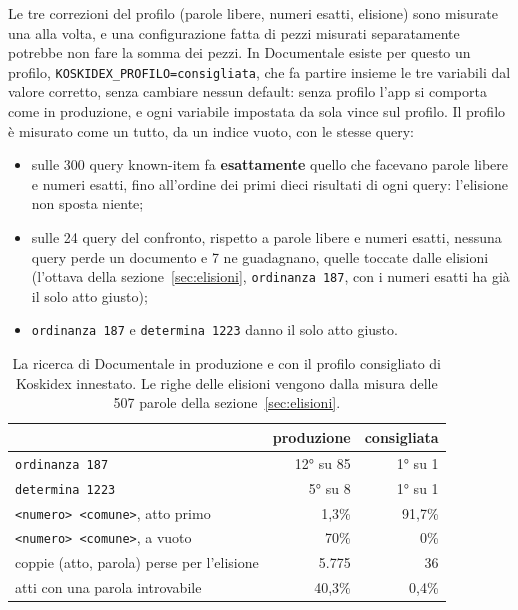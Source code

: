 Le tre correzioni del profilo (parole libere, numeri esatti, elisione) sono misurate una alla volta, e una configurazione fatta di
pezzi misurati separatamente potrebbe non fare la somma dei pezzi. In Documentale
esiste per questo un profilo, \texttt{KOSKIDEX\_PROFILO=consigliata}, che fa
partire insieme le tre variabili dal valore corretto, senza cambiare nessun
default: senza profilo l'app si comporta come in produzione, e ogni variabile
impostata da sola vince sul profilo. Il profilo è misurato come un tutto, da un
indice vuoto, con le stesse query:
\begin{itemize}
  \item sulle 300 query known-item fa \textbf{esattamente} quello che facevano
        parole libere e numeri esatti, fino all'ordine dei primi dieci risultati di
        ogni query: l'elisione non sposta niente;
  \item sulle 24 query del confronto, rispetto a parole libere e numeri esatti,
        nessuna query perde un documento e 7 ne guadagnano, quelle toccate
        dalle elisioni (l'ottava della sezione~\ref{sec:elisioni},
        \texttt{ordinanza 187}, con i numeri esatti ha già il solo atto giusto);
  \item \texttt{ordinanza 187} e \texttt{determina 1223} danno il solo atto giusto.
\end{itemize}

\begin{table}[ht]
  \centering
  \begin{tabular}{lrr}
    \toprule
    & produzione & consigliata \\
    \midrule
    \texttt{ordinanza 187} & 12° su 85 & 1° su 1 \\
    \texttt{determina 1223} & 5° su 8 & 1° su 1 \\
    \texttt{<numero> <comune>}, atto primo & 1,3\% & 91,7\% \\
    \texttt{<numero> <comune>}, a vuoto & 70\% & 0\% \\
    coppie (atto, parola) perse per l'elisione & 5.775 & 36 \\
    atti con una parola introvabile & 40,3\% & 0,4\% \\
    \bottomrule
  \end{tabular}
  \caption{La ricerca di Documentale in produzione e con il profilo consigliato di
  Koskidex innestato. Le righe delle elisioni vengono dalla misura delle 507
  parole della sezione~\ref{sec:elisioni}.}
  \label{tab:cosa-cambia}
\end{table}

